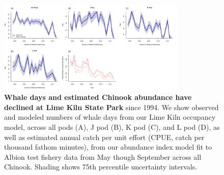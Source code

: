 \documentclass{article}
\begin{document}
\begin{figure}[!hp]
\includegraphics[width=0.8\textwidth]{../analyses/orcaphen/figures/modwhaledays_lime.png} 
\caption{\textbf{Whale days and estimated Chinook abundance have declined at Lime Kiln State Park} since 1994. We show observed and modeled numbers of whale days from our Lime Kiln occupancy model, across all pods (A), J pod (B), K pod (C), and L pod (D), as well as estimated annual catch per unit effort (CPUE, catch per thousand fathom minutes), from our abundance index model fit to Albion test fishery data from May though September across all Chinook. Shading shows 75th percentile uncertainty intervals.}
\label{fig:mlimewdays}
 \end{figure}
 
\end{document}
